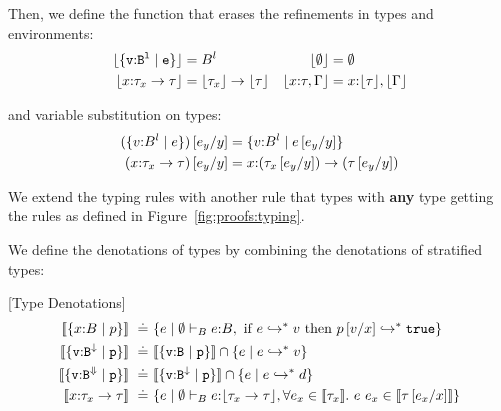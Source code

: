 Then, we define the function \erase{\bullet} that erases the refinements in types and environments:
\begin{align*}
\erase{\tlref{v}{B}{l}{e}}&=B^{l} &
\erase{\emptyset}&=\emptyset\\
\erase{\tfunref{x}{\tau_x}{\tau}{v}{e}}&= \erase{\tau_x} \rightarrow \erase{\tau} &
\erase{x\colon\tau, \Gamma}&= x\colon\erase{\tau},\erase{\Gamma}
\end{align*}

and variable substitution on types:
\begin{align*}
(\tref{v}{B}{l}{e})\sub{y}{e_y} &=\tref{v}{B}{l}{e\sub{y}{e_y}}\\
(\tfunref{x}{\tau_x}{\tau}{v}{e})\sub{y}{e_y} &=
	\tfunref{x}{(\tau_x\sub{y}{e_y})}{(\tau\sub{y}{e_y})}{v}{e\sub{y}{e_y}}\\
\end{align*}


We extend the typing rules with another rule that types \ebot with
\textbf{any} type getting the rules as defined in Figure~\ref{fig:proofs:typing}.
%

%

We define the denotations of types by combining the denotations 
of stratified types:
\begin{definition}{[Type Denotations]}
\begin{align*}
\interp{\tref{x}{\tbase}{}{p}} \defeq & 
    \{e \mid  \hastypebase{\emptyset}{e}{\tbase},
              \mbox{ if } \evals{e}{v} 
              \mbox{ then } \evals{\SUBST{p}{x}{v}}{\etrue} \}\\
\interp{\tlref{v}{\tbase}{\trivial}{p}} \defeq & 
    \interp{\tlref{v}{\tbase}{}{p}} \cap \{ e \mid \evals{e}{v} \}\\
\interp{\tlref{v}{\tbase}{\finite}{p}} \defeq & 
    \interp{\tlref{v}{\tbase}{\trivial}{p}} \cap \{ e \mid \evals{e}{d} \} \\
\interp{\tfun{x}{\typ_x}{\typ}} \defeq & 
    \{e \mid  \hastypebase{\emptyset}{e}{\erase{\tfunbasic{\typ_x}{\typ}}}, 
              \forall e_x \in \interp{\typ_x}.\ \eapp{e}{e_x} \in \interp{\typ\sub{x}{e_x}}
    \}
\end{align*}
\end{definition}

